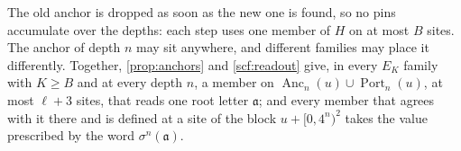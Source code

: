 The old anchor is dropped as soon as the new one is found, so no pins accumulate over the depths: each step uses one member of $H$ on at most $B$ sites. The anchor of depth $n$ may sit anywhere, and different families may place it differently. Together, \cref{prop:anchors} and \cref{scf:readout} give, in every $E_K$ family with $K\ge B$ and at every depth $n$, a member on $\operatorname{Anc}_n(u)\cup\operatorname{Port}_n(u)$, at most $\ell+3$ sites, that reads one root letter $\mathfrak a$; and every member that agrees with it there and is defined at a site of the block $u+[0,4^n)^2$ takes the value prescribed by the word $\sigma^n(\mathfrak a)$.


